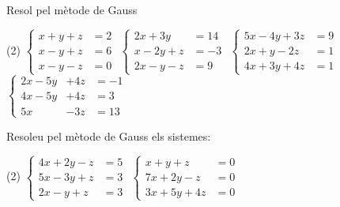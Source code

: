 \begin{mylist}
\begin{theorybox}
\end{theorybox}


 \exer[1] Resol pel mètode de Gauss
 \begin{tasks}(2)
 	\task  $\left\{\begin{array}{ll} x+y+z&=2 \\ x-y+z&=6 \\ x-y-z&=0 \end{array}\right. $       
 \task  $\left\{\begin{array}{ll} 2x+3y&=14 \\ x-2y+z&=-3 \\ 2x-y-z&=9 \end{array}\right. $ 
 \task  $\left\{\begin{array}{ll} 5x-4y+3z&=9 \\ 2x+y-2z&=1 \\ 4x+3y+4z&=1 \end{array}\right. $        
 \task  $\left\{\begin{array}{lll} 2x-5y&+4z&=-1 \\ 4x-5y&+4z&=3 \\ 5x&-3z&=13 \end{array}\right. $ 
 \end{tasks}
\answers[cols=1]{[
		 $x=1; y=-2; z=3$, 
		 $x=4; y=2; z=-3$, 
		 $x=1; y=-1; z=0$, 
		 $x=2; y=\dfrac{1}{5}; z=-1$ 
]}
 
 \exer  Resoleu pel mètode de  Gauss  els sistemes:
  \begin{tasks}(2)
\task $\left\{\begin{array}{rl} 4x+2y-z&=5 \\ 5x-3y+z&=3 \\ 2x-y+z&=3 \end{array}\right. $ 
\task $\left\{\begin{array}{rl} x+y+z&=0 \\ 7x+2y-z&=0 \\ 3x+5y+4z&=0 \end{array}\right. $
  \end{tasks}
\answers[cols=1]{[
	$x=\dfrac{16}{15}; y=\dfrac{8}{5}; z=\dfrac{39}{15}$, 
	$x=0; y=0; z=0$ 
	]}


\end{mylist}
